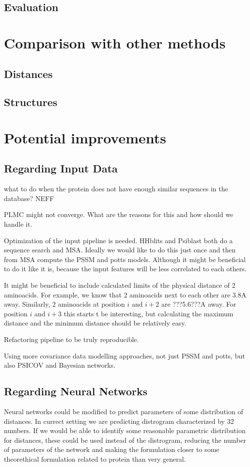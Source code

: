 \subsection{Evaluation}

\section{Comparison with other methods}
\subsection{Distances}
\subsection{Structures}

\section{Potential improvements}

\subsection{Regarding Input Data}
what to do when the protein does not have enough similar sequences in the database?
NEFF

PLMC might not converge. What are the reasons for this and how should we handle it.

Optimization of the input pipeline is needed.
HHblits and Psiblast both do a sequence search and MSA.
Ideally we would like to do this just once and then from MSA compute the PSSM and potts models.
Although it might be beneficial to do it like it is, because the input features will be less correlated to each others.

It might be beneficial to include calculated limits of the physical distance of 2 aminoacids.
For example, we know that 2 aminoacids next to each other are 3.8A away.
Similarly, 2 aminoacids at position $i$ and $i+2$ are ???5.6???A away.
For position $i$ and $i+3$ this starts t be interesting, but calculating the maximum distance and the minimum distance should be relatively easy.

Refactoring pipeline to be truly reproducible.

Using more covariance data modelling approaches, not just PSSM and potts, but also PSICOV and Bayesian networks.

\subsection{Regarding Neural Networks}
Neural networks could be modified to predict parameters of some distribution of distances.
In currect setting we are predicting distrogram characterized by 32 numbers.
If we would be able to identify some reasonable parametric distribution for distances, these could be used instead of the distrogram, reducing the number of parameters of the network and making the formulation closer to some theorethical formulation related to protein than very general.


